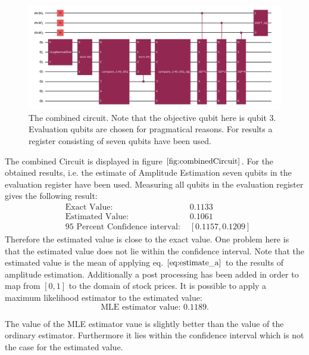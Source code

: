 \documentclass[../main.tex]{subfiles}
\begin{document}
 \begin{figure}[H]
  \begin{center}
    \includegraphics[width=\linewidth]{../../images/combinedCircuit.png}
  \end{center}
  \caption{The combined circuit. Note that the objective qubit here is qubit 3. Evaluation qubits are chosen for pragmatical reasons. For results a register consisting of seven qubits have been used.}
  \label{fig:combinedCircuit}
\end{figure}
The combined Circuit is displayed in figure $\ref{fig:combinedCircuit}$. For the obtained results, i.e. the estimate of Amplitude Estimation seven qubits in the evaluation register have been used. Measuring all qubits in the evaluation register gives the following result:
\begin{align}
    &\text{Exact Value: } &0.1133\\
    &\text{Estimated Value: } &0.1061\\
    &\text{95 Percent Confidence interval:	} &[0.1157, 0.1209]
\end{align}
Therefore the estimated value is close to the exact value. One problem here is that the estimated value does not lie within the confidence interval.
Note that the estimated value is the mean of applying eq. $\ref{eq:estimate_a}$ to the results of amplitude estimation. Additionally a post processing has been added in order to map from $[0,1]$ to the domain of stock prices. It is possible to apply a maximum likelihood estimator to the estimated value: 
\begin{equation}
    \text{MLE estimator value: } 0.1189.
\end{equation}

The value of the MLE estimator vaue is slightly better than the value of the ordinary estimator. Furthermore it lies within the confidence interval which is not the case for the estimated value.  
\end{document}

